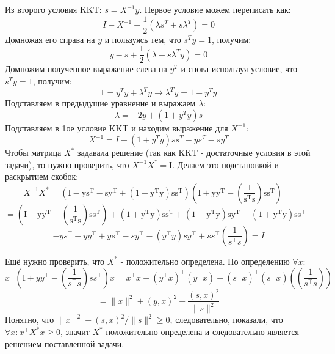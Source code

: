 \documentclass[a4paper,12pt]{article} %
\begin{document}
Из второго условия KKT: $ s = X^{-1} y $. Первое условие можем переписать как: 
$$
I-X^{-1}+\frac{1}{2}\left(\lambda s^{T}+s \lambda^{T}\right)=0
$$
Домножая его справа на $ y $ и пользуясь тем, что $ s^T y = 1 $, получим:
$$
y-s+\frac{1}{2}\left(\lambda+s \lambda^{T} y\right)=0
$$
Домножим полученное выражение слева на $ y^T $ и снова используя условие, что $ s^T y = 1 $, получим:
$$
1=y^{T} y+\lambda^{T} y \rightarrow \lambda^{T} y=1-y^{T} y
$$
Подставляем в предыдущие уравнение и выражаем $ \lambda $:
$$
\lambda=-2 y+\left(1+y^{T} y\right) s
$$
Подставляем в 1ое условие KKT и находим выражение для $ X^{-1} $:
$$
X^{-1}=I+\left(1+y^{T} y\right) s s^{T}-y s^{T}-s y^{T}
$$
Чтобы матрица $ X^* $ задавала решение (так как KKT - достаточные условия в этой задачи), то нужно проверить, что $ X^{-1} X^* = \mathrm{I} $. Делаем это подстановкой и раскрытием скобок:
$$
X^{-1} X^* = \left(\mathrm{I}-\mathrm{ys}^{\mathrm{T}}-\mathrm{s} \mathrm{y}^{\mathrm{T}}+\left(1+\mathrm{y}^{\mathrm{T}} \mathrm{y}\right) \mathrm{ss}^{\mathrm{T}}\right)\left(\mathrm{I}+\mathrm{y} \mathrm{y}^{\mathrm{T}}-\left(\frac{1}{\mathrm{s}^{\mathrm{T}} \mathrm{s}} \right) \mathrm{ss}^{\mathrm{T}}\right)=
$$
$$
=\left(\mathrm{I}+\mathrm{y} \mathrm{y}^{\mathrm{T}}-\left(\frac{1}{\mathrm{s}^{\mathrm{T}} \mathrm{s}}\right) \mathrm{ss}^{\mathrm{T}}\right)+\left(1+\mathrm{y}^{\mathrm{T}} \mathrm{y}\right) \mathrm{ss}^{\mathrm{T}}+\left(1+\mathrm{y}^{\mathrm{T}} \mathrm{y}\right) \mathrm{s} \mathrm{y}^{\mathrm{T}}-\left(1+\mathrm{y}^{\mathrm{T}} \mathrm{y}\right) \mathrm{ss}^{\top} -
$$
$$
-y s^{\top}-y y^{\top}+y s^{\top}-s y^{\top}-\left(y^{\top} y\right) s y^{\top}+s s^{\top}\left(\frac{1}{s^{\top} s}  \right)=I
$$

Ещё нужно проверить, что $ X^* $ - положительно определена. По определению $ \forall x $:
$$
x^{\top}\left(\mathrm{I}+y y^{\top}-\left(\frac{1}{s^{\top} s} \right) s s^{\top}\right) x=x^{\top} x+\left(y^{\top} x\right)^{\top}\left(y^{\top} x\right)-\left(s^{\top} x\right)^{\top}\left(s^{\top} x\right)\left(\left(\frac{1}{s^{\top} s}\right)\right)
$$
$$
=\|x\|^{2}+(y, x)^{2}-\frac{(s, x)^{2}}{\|s\|^{2}} 
$$
Понятно, что $ \|x\|^{2} - (s, x)^{2} /\|s\|^{2} \geq 0$, следовательно, показали, что $ \forall x : x^{\top}X^* x \geq 0 $, значит $ X^* $ положительно определена и следовательно является решением поставленной задачи.
\end{document}
